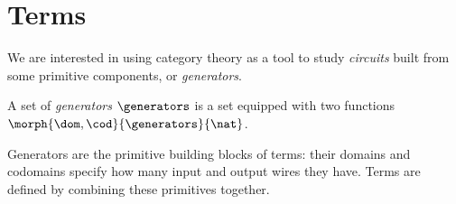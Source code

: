 \section{Terms}\label{sec:terms}

We are interested in using category theory as a tool to study \emph{circuits}
built from some primitive components, or \emph{generators}.

\begin{definition}[Generators]\label{def:generators}
    A set of \emph{generators} \(\generators\) is a set equipped with two
    functions \(\morph{\dom,\cod}{\generators}{\nat}\).
\end{definition}

Generators are the primitive building blocks of terms: their domains and
codomains specify how many input and output wires they have.
Terms are defined by combining these primitives together.

